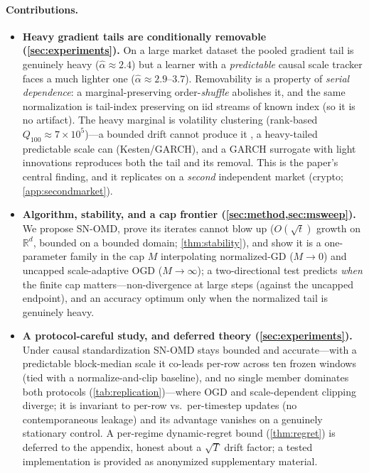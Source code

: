 \documentclass{article}
\newcommand{\R}{\mathbb{R}}
\begin{document}
\paragraph{Contributions.}
\begin{itemize}
  \item \textbf{Heavy gradient tails are conditionally removable (\cref{sec:experiments}).}
  On a large market dataset the pooled gradient tail is genuinely heavy
  ($\hat\alpha\approx2.4$) but a learner with a \emph{predictable} causal scale tracker
  faces a much lighter one ($\hat\alpha\approx2.9$--$3.7$). Removability is a property of
  \emph{serial dependence}: a marginal-preserving order-\emph{shuffle} abolishes it, and the
  same normalization is tail-index preserving on iid streams of known index (so it is no
  artifact). The heavy marginal is volatility clustering (rank-based
  $Q_{100}\!\approx\!7\!\times\!10^5$)---a bounded drift cannot produce it
  \citep{breiman1965}, a heavy-tailed predictable scale can (Kesten/GARCH), and a GARCH
  surrogate with light innovations reproduces both the tail and its removal. This is the
  paper's central finding, and it replicates on a \emph{second} independent market
  (crypto; \cref{app:secondmarket}).
  \item \textbf{Algorithm, stability, and a cap frontier (\cref{sec:method,sec:msweep}).}
  We propose SN-OMD, prove its iterates cannot blow up ($O(\sqrt t)$ growth on $\R^d$,
  bounded on a bounded domain; \cref{thm:stability}),
  and show it is a one-parameter family in the cap $M$ interpolating normalized-GD
  ($M\!\to\!0$) and uncapped scale-adaptive OGD ($M\!\to\!\infty$); a two-directional test
  predicts \emph{when} the finite cap matters---non-divergence at large steps (against the
  uncapped endpoint), and an
  accuracy optimum only when the normalized tail is genuinely heavy.
  \item \textbf{A protocol-careful study, and deferred theory (\cref{sec:experiments}).}
  Under causal standardization SN-OMD stays bounded and accurate---with a predictable
  block-median scale it co-leads per-row across ten frozen windows (tied with a
  normalize-and-clip baseline), and no single member dominates both protocols
  (\cref{tab:replication})---where OGD and
  scale-dependent clipping diverge; it is invariant to per-row vs.\ per-timestep updates
  (no contemporaneous leakage) and its advantage vanishes on a genuinely stationary
  control. A per-regime dynamic-regret bound (\cref{thm:regret}) is deferred to the
  appendix, honest about a $\sqrt T$ drift factor; a tested implementation is provided as
anonymized supplementary material.
\end{itemize}
\end{document}
